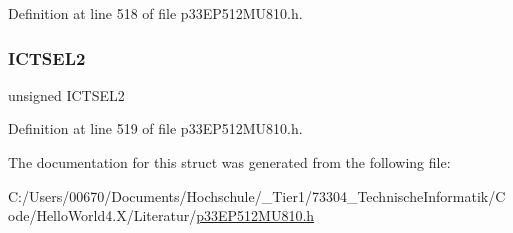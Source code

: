 Definition at line 518 of file p33\+E\+P512\+M\+U810.\+h.

\mbox{\label{structtag_i_c1_c_o_n1_b_i_t_s_a47d80892d449e6edbd5ba2ba9ff06deb}} 
\subsubsection{\texorpdfstring{I\+C\+T\+S\+E\+L2}{ICTSEL2}}
{\footnotesize\ttfamily unsigned I\+C\+T\+S\+E\+L2}



Definition at line 519 of file p33\+E\+P512\+M\+U810.\+h.



The documentation for this struct was generated from the following file\+:\begin{DoxyCompactItemize}
\item 
C\+:/\+Users/00670/\+Documents/\+Hochschule/\+\_\+\+Tier1/73304\+\_\+\+Technische\+Informatik/\+Code/\+Hello\+World4.\+X/\+Literatur/\hyperlink{p33_e_p512_m_u810_8h}{p33\+E\+P512\+M\+U810.\+h}\end{DoxyCompactItemize}
